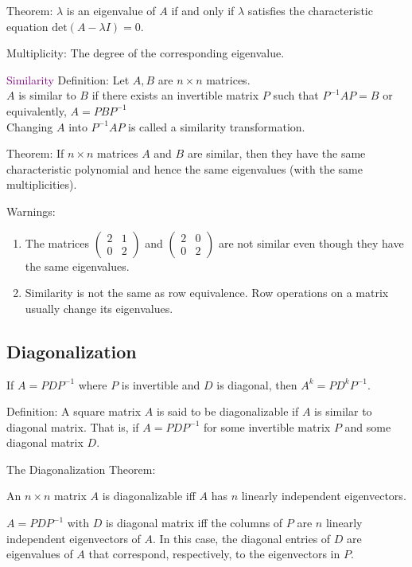 \documentclass[12pt]{article}
\begin{document}
Theorem: $\lambda$ is an eigenvalue of $A$ if and only if $\lambda$ satisfies the characteristic equation $\text{det}(A-\lambda I) = 0$.

Multiplicity: The degree of the corresponding eigenvalue.


\textcolor{purple}{Similarity}
Definition: Let $A, B$ are $n\times n$ matrices.\\
$A$ is similar to $B$ if there exists an invertible matrix $P$ such that $P^{-1}AP = B$ or equivalently, $A = PBP^{-1}$\\
Changing $A$ into $P^{-1}AP$ is called a similarity transformation.

Theorem: If $n\times n$ matrices $A$ and $B$ are similar, then they have the same characteristic polynomial and hence the same eigenvalues (with the same multiplicities).


Warnings:
\begin{enumerate}
    \item The matrices $\begin{pmatrix}
        2 & 1 \\
        0 & 2 
        \end{pmatrix}$ and $\begin{pmatrix}
            2 & 0 \\
            0 & 2 
        \end{pmatrix}$ are not similar even though they have the same eigenvalues.
    \item Similarity is not the same as row equivalence. Row operations on a matrix usually change its eigenvalues.
\end{enumerate}




\subsection{Diagonalization}
If $A = PDP^{-1}$ where $P$ is invertible and $D$ is diagonal, then $A^k = PD^kP^{-1}$.

Definition: A square matrix $A$ is said to be diagonalizable if $A$ is similar to  diagonal matrix. That is, if $A = PDP^{-1}$ for some invertible matrix $P$ and some diagonal matrix $D$.

The Diagonalization Theorem:

An $n\times n$ matrix $A$ is diagonalizable iff $A$ has $n$ linearly independent eigenvectors.

$A = PDP^{-1}$ with $D$ is diagonal matrix iff the columns of $P$ are $n$ linearly independent eigenvectors of $A$. In this case, the diagonal entries of $D$ are eigenvalues of $A$ that correspond, respectively, to the eigenvectors in $P$.
\end{document}

